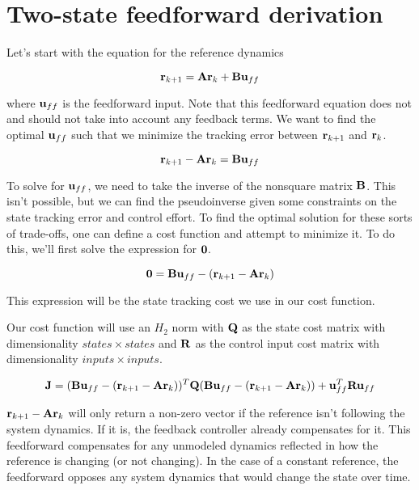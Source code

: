 \chapter{Two-state feedforward derivation} \label{ch:app-two-state-ff-deriv}

Let's start with the equation for the reference dynamics

\begin{equation*}
  \mathbf{r}_{k+1} = \mathbf{A}\mathbf{r}_k + \mathbf{B}\mathbf{u}_{ff}
\end{equation*}

where $\mathbf{u}_{ff}$ is the feedforward input. Note that this feedforward
equation does not and should not take into account any feedback terms. We want
to find the optimal $\mathbf{u}_{ff}$ such that we minimize the tracking error
between $\mathbf{r}_{k+1}$ and $\mathbf{r}_k$.

\begin{equation*}
  \mathbf{r}_{k+1} - \mathbf{A}\mathbf{r}_k = \mathbf{B}\mathbf{u}_{ff}
\end{equation*}

To solve for $\mathbf{u}_{ff}$, we need to take the inverse of the nonsquare matrix
$\mathbf{B}$. This isn't possible, but we can find the pseudoinverse given some
constraints on the state tracking error and control effort. To find the optimal
solution for these sorts of trade-offs, one can define a cost function and
attempt to minimize it. To do this, we'll first solve the expression for
$\mathbf{0}$.

\begin{equation*}
  \mathbf{0} = \mathbf{B}\mathbf{u}_{ff} - (\mathbf{r}_{k+1} - \mathbf{A}\mathbf{r}_k)
\end{equation*}

This expression will be the state tracking cost we use in our cost function.

Our cost function will use an $H_2$ norm with $\mathbf{Q}$ as the state cost matrix
with dimensionality $states \times states$ and $\mathbf{R}$ as the control input
cost matrix with dimensionality $inputs \times inputs$.

\begin{equation*}
  \mathbf{J} = (\mathbf{B}\mathbf{u}_{ff} - (\mathbf{r}_{k+1} - \mathbf{A}\mathbf{r}_k))^T \mathbf{Q}
    (\mathbf{B}\mathbf{u}_{ff} - (\mathbf{r}_{k+1} - \mathbf{A}\mathbf{r}_k)) +
    \mathbf{u}_{ff}^T\mathbf{R}\mathbf{u}_{ff}
\end{equation*}

\begin{remark}
  $\mathbf{r}_{k+1} - \mathbf{A}\mathbf{r}_k$ will only return a non-zero vector if the
  reference isn't following the system dynamics. If it is, the feedback
  controller already compensates for it. This feedforward compensates for any
  unmodeled dynamics reflected in how the reference is changing (or not
  changing). In the case of a constant reference, the feedforward opposes any
  system dynamics that would change the state over time.
\end{remark}

